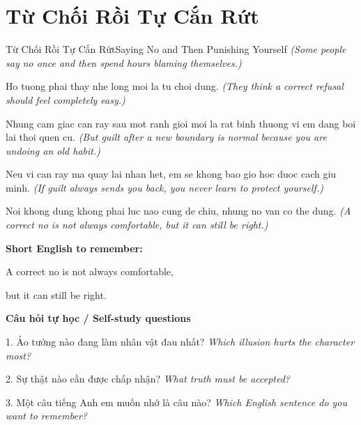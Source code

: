 \section{Từ Chối Rồi Tự Cắn Rứt}
\begin{truyen}{Từ Chối Rồi Tự Cắn Rứt}{Saying No and Then Punishing Yourself}
\textit{(Some people say no once and then spend hours blaming themselves.)}

Ho tuong phai thay nhe long moi la tu choi dung.
\textit{(They think a correct refusal should feel completely easy.)}

Nhung cam giac can ray sau mot ranh gioi moi la rat binh thuong vi em dang boi lai thoi quen cu.
\textit{(But guilt after a new boundary is normal because you are undoing an old habit.)}

Neu vi can ray ma quay lai nhan het, em se khong bao gio hoc duoc cach giu minh.
\textit{(If guilt always sends you back, you never learn to protect yourself.)}

\end{truyen}

\begin{baihoc}
Noi khong dung khong phai luc nao cung de chiu, nhung no van co the dung.
\textit{(A correct no is not always comfortable, but it can still be right.)}
\end{baihoc}

\begin{ghinhoanh}
\textbf{Short English to remember:}

A correct no is not always comfortable,

but it can still be right.

\end{ghinhoanh}

\begin{tuhocnhanh}
\textbf{Câu hỏi tự học / Self-study questions}

1. Ảo tưởng nào đang làm nhân vật đau nhất? \textit{Which illusion hurts the character most?}

2. Sự thật nào cần được chấp nhận? \textit{What truth must be accepted?}

3. Một câu tiếng Anh em muốn nhớ là câu nào? \textit{Which English sentence do you want to remember?}
\end{tuhocnhanh}
\ngancach

